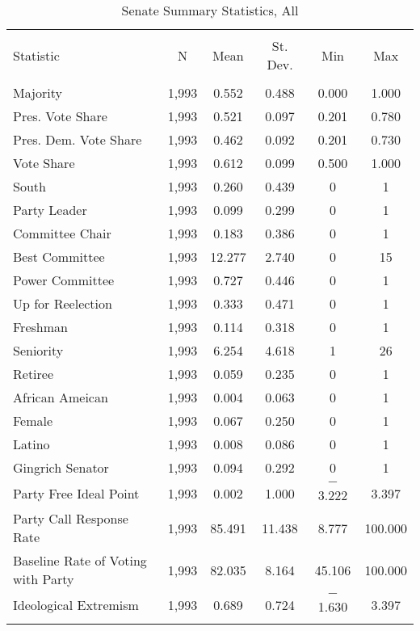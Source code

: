 \documentclass[12pt]{article}
\begin{document}
\begin{table}[!htbp] \centering 
	\caption{Senate Summary Statistics, All} 
	\label{} 
	\begin{tabular}{@{\extracolsep{5pt}}lccccc} 
		\\[-1.8ex]\hline 
		\hline \\[-1.8ex] 
		Statistic & \multicolumn{1}{c}{N} & \multicolumn{1}{c}{Mean} & \multicolumn{1}{c}{St. Dev.} & \multicolumn{1}{c}{Min} & \multicolumn{1}{c}{Max} \\ 
		\hline \\[-1.8ex] 
		Majority & 1,993 & 0.552 & 0.488 & 0.000 & 1.000 \\ 
		Pres. Vote Share & 1,993 & 0.521 & 0.097 & 0.201 & 0.780 \\ 
		Pres. Dem. Vote Share & 1,993 & 0.462 & 0.092 & 0.201 & 0.730 \\ 
		Vote Share & 1,993 & 0.612 & 0.099 & 0.500 & 1.000 \\ 
		South & 1,993 & 0.260 & 0.439 & 0 & 1 \\ 
		Party Leader & 1,993 & 0.099 & 0.299 & 0 & 1 \\ 
		Committee Chair & 1,993 & 0.183 & 0.386 & 0 & 1 \\ 
		Best Committee & 1,993 & 12.277 & 2.740 & 0 & 15 \\ 
		Power Committee & 1,993 & 0.727 & 0.446 & 0 & 1 \\ 
		Up for Reelection & 1,993 & 0.333 & 0.471 & 0 & 1 \\ 
		Freshman & 1,993 & 0.114 & 0.318 & 0 & 1 \\ 
		Seniority & 1,993 & 6.254 & 4.618 & 1 & 26 \\ 
		Retiree & 1,993 & 0.059 & 0.235 & 0 & 1 \\  
		African Ameican & 1,993 & 0.004 & 0.063 & 0 & 1 \\ 
		Female & 1,993 & 0.067 & 0.250 & 0 & 1 \\ 
		Latino & 1,993 & 0.008 & 0.086 & 0 & 1 \\ 
		Gingrich Senator & 1,993 & 0.094 & 0.292 & 0 & 1 \\ 
		Party Free Ideal Point & 1,993 & 0.002 & 1.000 & $-$3.222 & 3.397 \\ 
		Party Call Response Rate & 1,993 & 85.491 & 11.438 & 8.777 & 100.000 \\ 
		Baseline Rate of Voting with Party & 1,993 & 82.035 & 8.164 & 45.106 & 100.000 \\ 
		Ideological Extremism & 1,993 & 0.689 & 0.724 & $-$1.630 & 3.397 \\ 
		\hline \\[-1.8ex] 
	\end{tabular} 
\end{table} 
\end{document}
